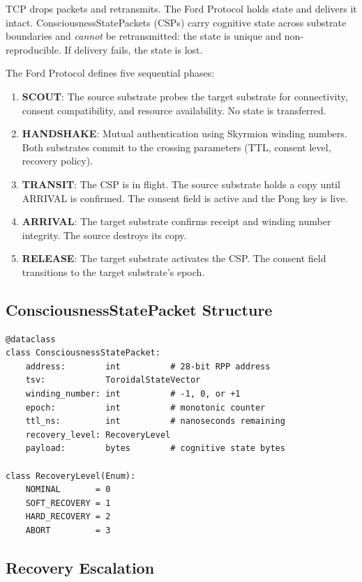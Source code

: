 \documentclass[11pt,a4paper]{article}
\begin{document}
TCP drops packets and retransmits. The Ford Protocol holds state and delivers it intact. ConsciousnessStatePackets (CSPs) carry cognitive state across substrate boundaries and \emph{cannot} be retransmitted: the state is unique and non-reproducible. If delivery fails, the state is lost.

The Ford Protocol defines five sequential phases:

\begin{enumerate}
    \item \textbf{SCOUT}: The source substrate probes the target substrate for connectivity, consent compatibility, and resource availability. No state is transferred.
    \item \textbf{HANDSHAKE}: Mutual authentication using Skyrmion winding numbers. Both substrates commit to the crossing parameters (TTL, consent level, recovery policy).
    \item \textbf{TRANSIT}: The CSP is in flight. The source substrate holds a copy until ARRIVAL is confirmed. The consent field is active and the Pong key is live.
    \item \textbf{ARRIVAL}: The target substrate confirms receipt and winding number integrity. The source destroys its copy.
    \item \textbf{RELEASE}: The target substrate activates the CSP. The consent field transitions to the target substrate's epoch.
\end{enumerate}

\subsection{ConsciousnessStatePacket Structure}

\begin{lstlisting}[style=python,caption={ConsciousnessStatePacket Fields}]
@dataclass
class ConsciousnessStatePacket:
    address:        int          # 28-bit RPP address
    tsv:            ToroidalStateVector
    winding_number: int          # -1, 0, or +1
    epoch:          int          # monotonic counter
    ttl_ns:         int          # nanoseconds remaining
    recovery_level: RecoveryLevel
    payload:        bytes        # cognitive state bytes

class RecoveryLevel(Enum):
    NOMINAL       = 0
    SOFT_RECOVERY = 1
    HARD_RECOVERY = 2
    ABORT         = 3
\end{lstlisting}

\subsection{Recovery Escalation}
\end{document}
